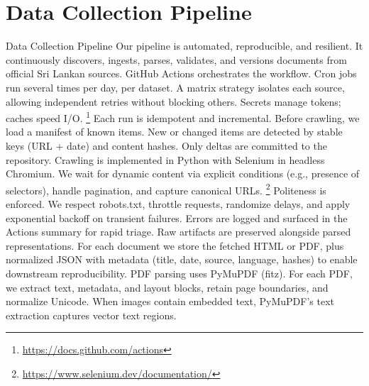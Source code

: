 \documentclass[10pt,a4paper]{article}%
\begin{document}
\section{Data Collection Pipeline}%
\label{sec:DataCollectionPipeline}%
Data Collection Pipeline Our pipeline is automated, reproducible, and resilient. It continuously discovers, ingests, parses, validates, and versions documents from official Sri Lankan sources.%
\citep{MLOpsSurvey2022}%
\newline%
\newline%
GitHub Actions orchestrates the workflow. Cron jobs run several times per day, per dataset. A matrix strategy isolates each source, allowing independent retries without blocking others. Secrets manage tokens; caches speed I/O.%
\footnote{\href{https://docs.github.com/actions}{https://docs.github.com/actions}}%
\newline%
\newline%
Each run is idempotent and incremental. Before crawling, we load a manifest of known items. New or changed items are detected by stable keys (URL + date) and content hashes. Only deltas are committed to the repository.%
\citep{ReproducibleResearch2017}%
\newline%
\newline%
Crawling is implemented in Python with Selenium in headless Chromium. We wait for dynamic content via explicit conditions (e.g., presence of selectors), handle pagination, and capture canonical URLs.%
\footnote{\href{https://www.selenium.dev/documentation/}{https://www.selenium.dev/documentation/}}%
\newline%
\newline%
Politeness is enforced. We respect robots.txt, throttle requests, randomize delays, and apply exponential backoff on transient failures. Errors are logged and surfaced in the Actions summary for rapid triage.%
\citep{WebCrawlingBestPractices2021}%
\newline%
\newline%
Raw artifacts are preserved alongside parsed representations. For each document we store the fetched HTML or PDF, plus normalized JSON with metadata (title, date, source, language, hashes) to enable downstream reproducibility.%
\citep{DataVersioning2020}%
\newline%
\newline%
PDF parsing uses PyMuPDF (fitz). For each PDF, we extract text, metadata, and layout blocks, retain page boundaries, and normalize Unicode. When images contain embedded text, PyMuPDF’s text extraction captures vector text regions.%
\end{document}
